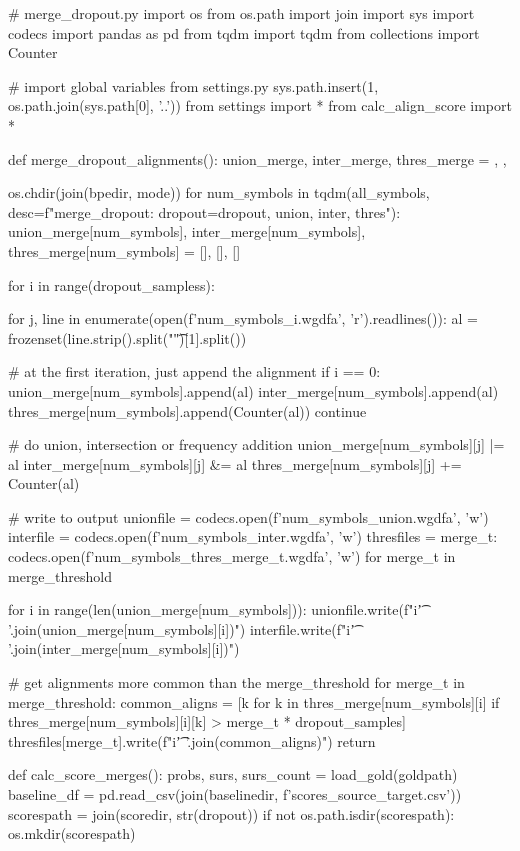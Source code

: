 \begin{python}
# merge_dropout.py
import os
from os.path import join
import sys
import codecs
import pandas as pd
from tqdm import tqdm
from collections import Counter

# import global variables from settings.py
sys.path.insert(1, os.path.join(sys.path[0], '..'))
from settings import *
from calc_align_score import *

def merge_dropout_alignments():
  union_merge, inter_merge, thres_merge = {}, {}, {}

  os.chdir(join(bpedir, mode))
  for num_symbols in tqdm(all_symbols, desc=f"merge_dropout: dropout={dropout}, union, inter, thres"):
    union_merge[num_symbols], inter_merge[num_symbols], thres_merge[num_symbols] = [], [], []

    for i in range(dropout_sampless):

      for j, line in enumerate(open(f'{num_symbols}_{i}.wgdfa', 'r').readlines()):
        al = frozenset(line.strip().split("\t")[1].split())

        # at the first iteration, just append the alignment
        if i == 0:
          union_merge[num_symbols].append(al)
          inter_merge[num_symbols].append(al)
          thres_merge[num_symbols].append(Counter(al))
          continue
        
        # do union, intersection or frequency addition
        union_merge[num_symbols][j] |= al
        inter_merge[num_symbols][j] &= al
        thres_merge[num_symbols][j] += Counter(al)

    # write to output
    unionfile = codecs.open(f'{num_symbols}_union.wgdfa', 'w')
    interfile = codecs.open(f'{num_symbols}_inter.wgdfa', 'w')
    thresfiles = {merge_t: codecs.open(f'{num_symbols}_thres_{merge_t}.wgdfa', 'w') for merge_t in merge_threshold}

    for i in range(len(union_merge[num_symbols])):
      unionfile.write(f"{i}\t{' '.join(union_merge[num_symbols][i])}\n")
      interfile.write(f"{i}\t{' '.join(inter_merge[num_symbols][i])}\n")

      # get alignments more common than the merge_threshold %
      for merge_t in merge_threshold:
        common_aligns = [k for k in thres_merge[num_symbols][i] 
                        if thres_merge[num_symbols][i][k] > merge_t * dropout_samples]
        thresfiles[merge_t].write(f"{i}\t{' '.join(common_aligns)}\n")
  return


def calc_score_merges():
  probs, surs, surs_count = load_gold(goldpath)
  baseline_df = pd.read_csv(join(baselinedir, f'scores_{source}_{target}.csv'))
  scorespath = join(scoredir, str(dropout))
  if not os.path.isdir(scorespath):
      os.mkdir(scorespath)


\end{python}
